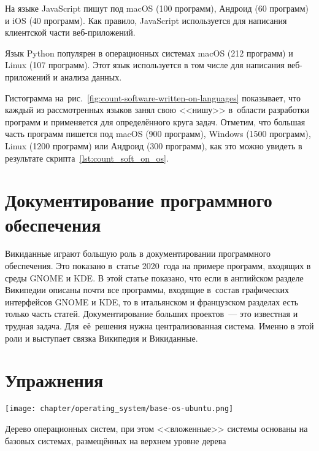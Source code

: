 На языке JavaScript пишут под macOS (100 программ), 
Андроид (60 программ) и iOS (40 программ). Как правило, 
JavaScript используется для написания клиентской части веб-приложений.

Язык Python популярен в операционных системах macOS (212 программ) и Linux (107 программ). 
Этот язык используется в том числе для написания веб-приложений и анализа данных.

Гистограмма на~рис.~\ref{fig:count-software-written-on-languages} показывает, 
что каждый из рассмотренных языков занял свою <<нишу>> в~области разработки программ 
и применяется для определённого круга задач. 
Отметим, что большая часть программ пишется под macOS (900 программ), Windows (1500 программ), Linux (1200 программ) или Андроид (300 программ), как это можно увидеть в результате скрипта~\ref{lst:count_soft_on_os}.




\newpage
\section{Документирование программного обеспечения}
Викиданные играют большую роль в документировании программного обеспечения. 
Это показано в~статье 2020~года\autocite{Samuel2020DocumentingWiki} на примере программ, входящих в среды GNOME и KDE. 
В этой статье показано, что если в английском разделе Википедии описаны почти все программы, 
входящие в~состав графических интерфейсов GNOME и KDE, 
то в итальянском и французском разделах есть только часть статей. 
Документирование больших проектов~--- это известная и трудная задача. 
Для~её~решения нужна централизованная система. 
Именно в этой роли и выступает связка Википедия и Викиданные\autocite{Samuel2020DocumentingWiki}.


\section{Упражнения}
\label{tasks:operating_system_tasks}

\begin{marginfigure}[0\baselineskip]
    \texttt{[image: chapter/operating\_system/base-os-ubuntu.png]}
    \caption{Дерево операционных систем, при этом <<вложенные>> системы основаны на базовых системах, размещённых на верхнем уровне дерева}
	\label{fig:base-os-ubuntu}%
\end{marginfigure}

